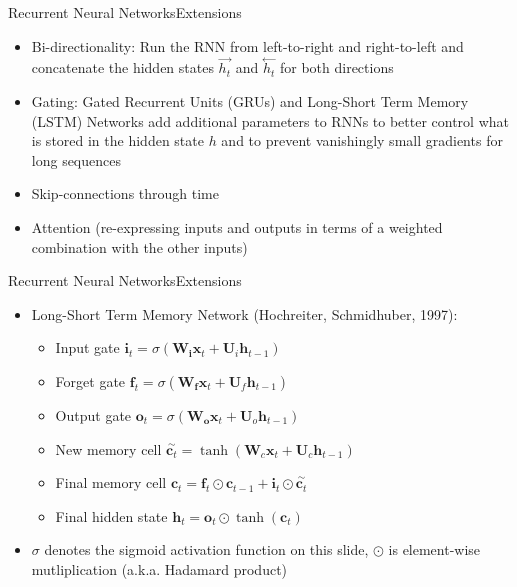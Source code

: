\begin{frame}{Recurrent Neural Networks}{Extensions}
	\begin{itemize}
		\item Bi-directionality: Run the RNN from left-to-right and right-to-left and concatenate the hidden states $\overset{\rightarrow}{h_t}$ and $\overset{\leftarrow}{h_t}$ for both directions
		\item Gating: Gated Recurrent Units (GRUs) and Long-Short Term Memory (LSTM) Networks add additional parameters to RNNs to better control what is stored in the hidden state $h$ and to prevent vanishingly small gradients for long sequences
		\item Skip-connections through time
		\item Attention (re-expressing inputs and outputs in terms of a weighted combination with the other inputs)
	\end{itemize}
\end{frame}

\begin{frame}{Recurrent Neural Networks}{Extensions}
	\begin{itemize}
		\item Long-Short Term Memory Network (Hochreiter, Schmidhuber, 1997):
		\begin{itemize}
			\item Input gate $\bm{i}_t = \sigma(\bm{W_i} \bm{x}_t + \bm{U}_i \bm{h}_{t-1})$
			\item Forget gate $\bm{f}_t =\sigma(\bm{W_f} \bm{x}_t + \bm{U}_f \bm{h}_{t-1})$
			\item Output gate $\bm{o}_t =\sigma(\bm{W_o} \bm{x}_t + \bm{U}_o \bm{h}_{t-1})$
			\item New memory cell $\overset{\sim}{\bm{c}_t} = \tanh(\bm{W}_c \bm{x}_t + \bm{U}_c \bm{h}_{t-1})$
			\item Final memory cell $\bm{c}_t = \bm{f}_t \odot \bm{c}_{t-1} + \bm{i}_t \odot \overset{\sim}{\bm{c}_t}$
			\item Final hidden state $\bm{h}_t = \bm{o}_t \odot \tanh(\bm{c}_t)$
		\end{itemize}
		\item $\sigma$ denotes the sigmoid activation function on this slide, $\odot$ is element-wise mutliplication (a.k.a. Hadamard product)
	\end{itemize}
\end{frame}

